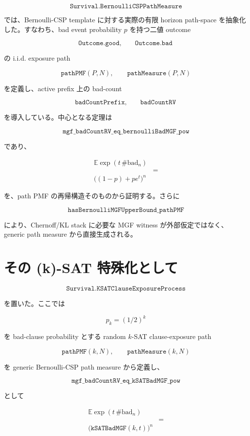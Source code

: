 \documentclass[12pt,a4paper]{article}
\begin{document}
\[
\texttt{Survival.BernoulliCSPPathMeasure}
\]

では、Bernoulli-CSP template に対する実際の有限 horizon path-space を抽象化した。すなわち、bad event probability \(p\) を持つ二値 outcome

\[
\texttt{Outcome.good},\qquad \texttt{Outcome.bad}
\]

の i.i.d. exposure path

\[
\texttt{pathPMF}(P,N),\qquad \texttt{pathMeasure}(P,N)
\]

を定義し、active prefix 上の bad-count

\[
\texttt{badCountPrefix},\qquad \texttt{badCountRV}
\]

を導入している。中心となる定理は

\[
\texttt{mgf\_badCountRV\_eq\_bernoulliBadMGF\_pow}
\]

であり、

\[
\begin{aligned}
\mathbb{E}\exp(t\,\#\mathrm{bad}_{n}) \\
&= \\
\bigl((1-p)+p e^{t}\bigr)^n
\end{aligned}
\]

を、path PMF の再帰構造そのものから証明する。さらに

\[
\texttt{hasBernoulliMGFUpperBound\_pathPMF}
\]

により、Chernoff/KL stack に必要な MGF witness が外部仮定ではなく、generic path measure から直接生成される。

\section{その (k)-SAT 特殊化として}\label{ux305dux306e-k-sat-ux7279ux6b8aux5316ux3068ux3057ux3066}

\[
\texttt{Survival.KSATClauseExposureProcess}
\]

を置いた。ここでは

\[
p_{k}=(1/2)^k
\]

を bad-clause probability とする random \(k\)-SAT clause-exposure path

\[
\texttt{pathPMF}(k,N),\qquad \texttt{pathMeasure}(k,N)
\]

を generic Bernoulli-CSP path measure から定義し、

\[
\texttt{mgf\_badCountRV\_eq\_kSATBadMGF\_pow}
\]

として

\[
\begin{aligned}
\mathbb{E}\exp(t\,\#\mathrm{bad}_{n}) \\
&= \\
\bigl(\texttt{kSATBadMGF}(k,t)\bigr)^n
\end{aligned}
\]
\end{document}
